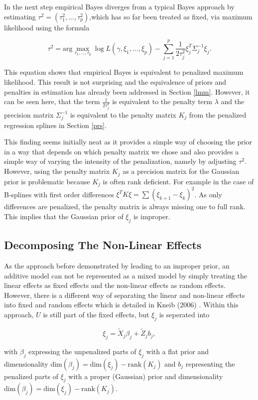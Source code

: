 \documentclass[12pt]{article}
\begin{document}
In the next step empirical Bayes diverges from a typical Bayes approach by estimating $\tau^2 = (\tau^2_1,..., \tau^2_p)$,which has so far been treated as fixed, via maximum likelihood using the formula

$$\tau^2 = \text{arg}\max_{\tau_1, ..., \tau_p} \log L(\gamma, \xi_1,...,\xi_p) - \sum_{j=1}^p \frac{1}{2\tau^2_j} \xi_j^T \Sigma^{-1}_j \xi_j.$$

This equation shows that empirical Bayes is equivalent to penalized maximum likelihood. This result is not surprising and the equivalence of priors and penalties in estimation has already been addressed in Section \ref{lmm}. However, it can be seen here, that the term $\frac{1}{2\tau^2_j}$ is equivalent to the penalty term $\lambda$ and the precision matrix $\Sigma^{-1}_j$ is equivalent to the penalty matrix $K_j$ from the penalized regression splines in Section \ref{prs}. 

This finding seems initially neat as it provides a simple way of choosing the prior in a way that depends on which penalty matrix we chose and also provides a simple way of varying the intensity of the penalization, namely by adjusting $\tau^2$. However, using the penalty matrix $K_j$ as a precision matrix for the Gaussian prior is problematic because $K_j$ is often rank deficient. For example in the case of B-splines with first order differences $\xi^TK\xi = \sum(\xi_{k+1} - \xi_{k})^2$. As only differences are penalized, the penalty matrix is always missing one to full rank. This implies that the Gaussian prior of $\xi_j$ is improper.

\subsection{Decomposing The Non-Linear Effects}

As the approach before demonstrated by leading to an improper prior, an additive model can not be represented as a mixed model by simply treating the linear effects as fixed effects and the non-linear effects as random effects. However, there is a different way of separating the linear and non-linear effects into fixed and random effects which is detailed in Kneib (2006) \cite{kneib2006mixed}. Within this approach, $U$ is still part of the fixed effects, but $\xi_j$ is seperated into 

$$\xi_j = \tilde{X}_j \beta_j + \tilde{Z}_j b_j,\label{decomp}$$

with $\beta_j$ expressing the unpenalized parts of $\xi_j$ with a flat prior and dimensionality 
$\text{dim}(\beta_j) = \text{dim}(\xi_j) {-} \text{rank}(K_j)$ and $b_j$ representing the penalized parts of $\xi_j$ with a proper (Gaussian) prior and dimensionality $\text{dim}(\beta_j) = \text{dim}(\xi_j) {-} \text{rank}(K_j)$.
\end{document}
